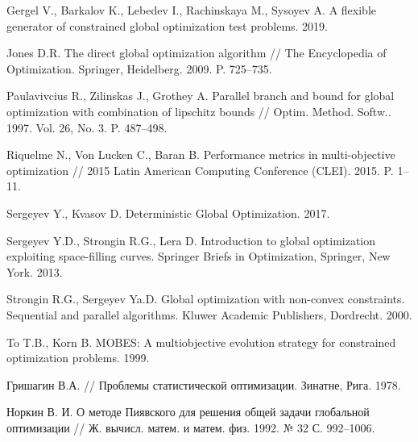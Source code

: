 \documentclass{cmi}
\begin{document}
\begin{biblio}
  Gergel V., Barkalov K., Lebedev I., Rachinskaya M., Sysoyev A.
  \newblock A flexible generator of constrained global optimization test
    problems. 2019.
  \newblock {}

  {Jones D.R.}
  \newblock The direct global optimization algorithm
  \newblock // The Encyclopedia of Optimization. Springer, Heidelberg. 2009. P.
    725--735.
  \newblock {}

  {Paulavivcius R., Zilinskas J., Grothey A.}
  \newblock Parallel branch and bound for global optimization with combination of
    lipschitz bounds //
  \newblock Optim. Method. Softw.. 1997. Vol. 26, No. 3. P. 487--498.
  \newblock {}

  {Riquelme} N., {Von Lucken} C., {Baran} B.
  \newblock Performance metrics in multi-objective optimization
  \newblock // 2015 Latin American Computing Conference (CLEI). 2015. P. 1--11.
  \newblock {}

  Sergeyev Y., Kvasov D. Deterministic Global Optimization. 2017.
  \newblock {}

  {Sergeyev Y.D., Strongin R.G., Lera D.} Introduction to global optimization
    exploiting space-filling curves.
  \newblock Springer Briefs in Optimization, Springer, New York. 2013.
  \newblock {}

  {Strongin R.G., Sergeyev Ya.D.} Global optimization with non-convex
    constraints. Sequential and parallel algorithms.
  \newblock Kluwer Academic Publishers, Dordrecht. 2000.
  \newblock {}

  To T.B., Korn B.
  \newblock MOBES: A multiobjective evolution strategy for constrained
    optimization problems. 1999.

  {Гришагин В.А.}
  \newblock // Проблемы статистической
    оптимизации. Зинатне, Рига. 1978.

  {Норкин В. И.}
  \newblock О методе Пиявского для решения общей
    задачи глобальной оптимизации //
  \newblock Ж. вычисл. матем. и матем. физ. 1992. № 32 С. 992--1006.
\end{biblio}
\end{document}
